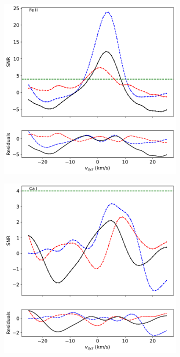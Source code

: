 \documentclass[twocolumn]{aastex631}
\begin{document}
\begin{figure}[ht!]
\begin{subfigure}[b]{0.3\textwidth}
                \includegraphics[width=\textwidth]{plots-updated/line-profile-overlaidarms/KELT-20b.20190504.combined.Fe II.line-profiles-overlaidarms.pdf}
            \end{subfigure}
            \begin{subfigure}[b]{0.3\textwidth}
                \centering
                \includegraphics[width=\textwidth]{plots-updated/line-profile-overlaidarms/KELT-20b.20190504.combined.Ca I.line-profiles-overlaidarms.pdf}

\end{subfigure}
\end{figure}
\end{document}
